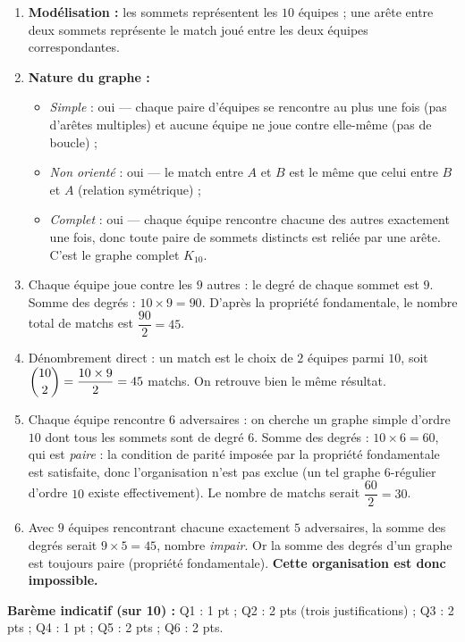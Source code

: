 \documentclass[11pt]{article}
\begin{document}
\begin{corrige}
\begin{enumerate}
\item \textbf{Modélisation :} les sommets représentent les $10$ équipes ; une arête entre deux sommets représente le match joué entre les deux équipes correspondantes.
\item \textbf{Nature du graphe :}
\begin{itemize}
\item \emph{Simple} : oui --- chaque paire d'équipes se rencontre au plus une fois (pas d'arêtes multiples) et aucune équipe ne joue contre elle-même (pas de boucle) ;
\item \emph{Non orienté} : oui --- le match entre $A$ et $B$ est le même que celui entre $B$ et $A$ (relation symétrique) ;
\item \emph{Complet} : oui --- chaque équipe rencontre chacune des autres exactement une fois, donc toute paire de sommets distincts est reliée par une arête. C'est le graphe complet $K_{10}$.
\end{itemize}
\item Chaque équipe joue contre les $9$ autres : le degré de chaque sommet est $9$. Somme des degrés : $10 \times 9 = 90$. D'après la propriété fondamentale, le nombre total de matchs est $\dfrac{90}{2} = 45$.
\item Dénombrement direct : un match est le choix de $2$ équipes parmi $10$, soit $\dbinom{10}{2} = \dfrac{10 \times 9}{2} = 45$ matchs. On retrouve bien le même résultat.
\item Chaque équipe rencontre $6$ adversaires : on cherche un graphe simple d'ordre $10$ dont tous les sommets sont de degré $6$. Somme des degrés : $10 \times 6 = 60$, qui est \emph{paire} : la condition de parité imposée par la propriété fondamentale est satisfaite, donc l'organisation n'est pas exclue (un tel graphe $6$-régulier d'ordre $10$ existe effectivement). Le nombre de matchs serait $\dfrac{60}{2} = 30$.
\item Avec $9$ équipes rencontrant chacune exactement $5$ adversaires, la somme des degrés serait $9 \times 5 = 45$, nombre \emph{impair}. Or la somme des degrés d'un graphe est toujours paire (propriété fondamentale). \textbf{Cette organisation est donc impossible.}
\end{enumerate}
\textbf{Barème indicatif (sur 10) :} Q1 : 1 pt ; Q2 : 2 pts (trois justifications) ; Q3 : 2 pts ; Q4 : 1 pt ; Q5 : 2 pts ; Q6 : 2 pts.
\end{corrige}
\end{document}
